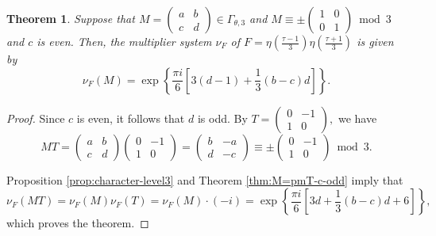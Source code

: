 \documentclass[12pt]{article}
\theoremstyle{definition}
\newtheorem{theorem}{Theorem}
\numberwithin{equation}{section}
\numberwithin{theorem}{section}
\begin{document}
\begin{theorem}
\label{thm:M=pmI-c-even}
{\it
Suppose that 
$
M=
\begin{pmatrix}
a & b \\
c & d
\end{pmatrix}
\in 
\Gamma_{\theta,3}
$ 
and 
$M\equiv 
\pm
\begin{pmatrix}
1 & 0 \\
0 & 1
\end{pmatrix} 
\bmod{3}
$ 
and 
$c$ is even. 
Then, 
the multiplier system 
$\nu_{F}$ of 
$
\displaystyle 
F=
\eta \left(\frac{\tau-1}{3} \right) \eta\left(\frac{\tau+1}{3} \right)
$ 
is given by 
\begin{equation*}
\nu_{F}
(M)
=
\exp
\left\{
\frac{\pi i}{6}
\left[
3(d-1)+\frac13(b-c)d
\right]
\right\}. 
\end{equation*}
}
\end{theorem}



\begin{proof}
Since $c$ is even, it follows that $d$ is odd. 
By 
$
T
=
\begin{pmatrix}
0 & -1 \\
1 & 0
\end{pmatrix}, 
$ 
we have 
\begin{equation*}
MT
=
\begin{pmatrix}
a & b \\
c & d
\end{pmatrix}
\begin{pmatrix}
0 & -1 \\
1 & 0
\end{pmatrix}
=
\begin{pmatrix}
b & -a \\
d & -c
\end{pmatrix}
\equiv
\pm
\begin{pmatrix}
0 & -1 \\
1 & 0
\end{pmatrix}
\bmod{3}.
\end{equation*}
\par
Proposition \ref{prop:character-level3} and Theorem \ref{thm:M=pmT-c-odd} 
imply that 
\begin{equation*}
\nu_{F}(MT)=\nu_{F}(M)\nu_{F}(T)=\nu_{F}(M)\cdot(-i)
=
\exp
\left\{
\frac{\pi i}{6}
\left[
3d+\frac13(b-c)d+6
\right]
\right\},
\end{equation*}
which proves the theorem. 
\end{proof}
\end{document}
